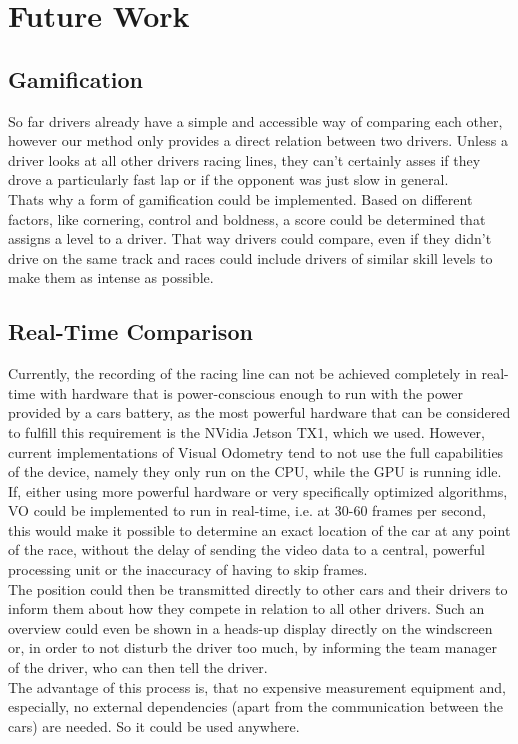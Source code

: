 \section{Future Work}
\label{sec:future_work}

\subsection{Gamification}
So far drivers already have a simple and accessible way of comparing each other, however our method only provides a direct relation between two drivers. Unless a driver looks at all other drivers racing lines, they can't certainly asses if they drove a particularly fast lap or if the opponent was just slow in general.\\
Thats why a form of gamification could be implemented. Based on different factors, like cornering, control and boldness, a score could be determined that assigns a level to a driver. That way drivers could compare, even if they didn't drive on the same track and races could include drivers of similar skill levels to make them as intense as possible.

\subsection{Real-Time Comparison}
Currently, the recording of the racing line can not be achieved completely in real-time with hardware that is power-conscious enough to run with the power provided by a cars battery, as the most powerful hardware that can be considered to fulfill this requirement is the NVidia Jetson TX1, which we used. However, current implementations of Visual Odometry tend to not use the full capabilities of the device, namely they only run on the CPU, while the GPU is running idle. If, either using more powerful hardware or very specifically optimized algorithms, VO could be implemented to run in real-time, i.e. at 30-60 frames per second, this would make it possible to determine an exact location of the car at any point of the race, without the delay of sending the video data to a central, powerful processing unit or the inaccuracy of having to skip frames.\\
The position could then be transmitted directly to other cars and their drivers to inform them about how they compete in relation to all other drivers. Such an overview could even be shown in a heads-up display directly on the windscreen or, in order to not disturb the driver too much, by informing the team manager of the driver, who can then tell the driver.\\
The advantage of this process is, that no expensive measurement equipment and, especially, no external dependencies (apart from the communication between the cars) are needed. So it could be used anywhere.

